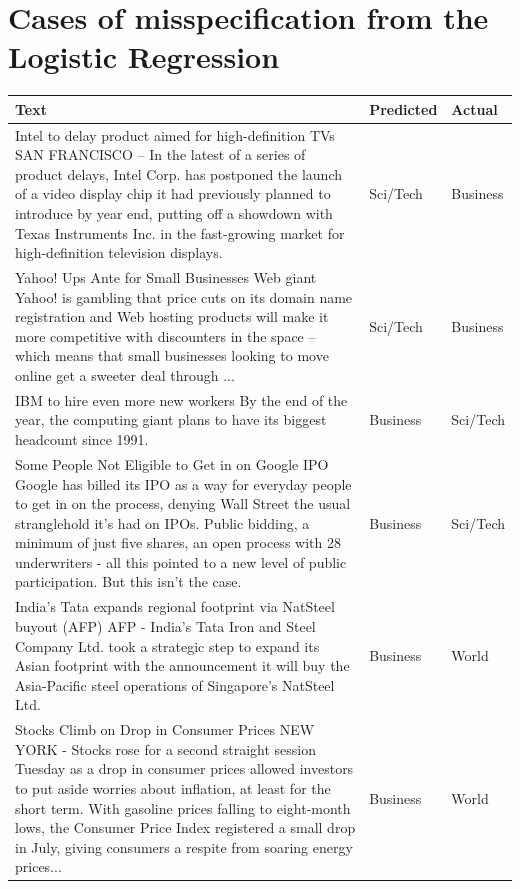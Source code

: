 \documentclass[12pt,a4paper,english]{article}
\begin{document}
\section{Cases of misspecification from the Logistic Regression} \label{ap:log_reg_miss}

\begin{longtable}{| m{25em} | m{5em} | m{5em} |}
        \hline
        \textbf{Text} & \textbf{Predicted} & \textbf{Actual} \\ \hline

        Intel to delay product aimed for high-definition TVs SAN FRANCISCO -- In the latest of a series of product delays, Intel Corp. has postponed the launch of a video display chip it had previously planned to introduce by year end, putting off a showdown with Texas Instruments Inc. in the fast-growing market for high-definition television displays. & Sci/Tech & Business \\ \hline
Yahoo! Ups Ante for Small Businesses Web giant Yahoo! is gambling that price cuts on its domain name registration and Web hosting products will make it more competitive with discounters in the space -- which means that small businesses looking to move online get a sweeter deal through ... & Sci/Tech & Business \\ \hline
IBM to hire even more new workers By the end of the year, the computing giant plans to have its biggest headcount since 1991. & Business & Sci/Tech \\ \hline
Some People Not Eligible to Get in on Google IPO Google has billed its IPO as a way for everyday people to get in on the process, denying Wall Street the usual stranglehold it's had on IPOs. Public bidding, a minimum of just five shares, an open process with 28 underwriters - all this pointed to a new level of public participation. But this isn't the case. & Business & Sci/Tech \\ \hline
India's Tata expands regional footprint via NatSteel buyout (AFP) AFP - India's Tata Iron and Steel Company Ltd. took a strategic step to expand its Asian footprint with the announcement it will buy the Asia-Pacific steel operations of Singapore's NatSteel Ltd. & Business & World \\ \hline
Stocks Climb on Drop in Consumer Prices NEW YORK - Stocks rose for a second straight session Tuesday as a drop in consumer prices allowed investors to put aside worries about inflation, at least for the short term. With gasoline prices falling to eight-month lows, the Consumer Price Index registered a small drop in July, giving consumers a respite from soaring energy prices... & Business & World \\ \hline

\end{longtable}
\end{document}
